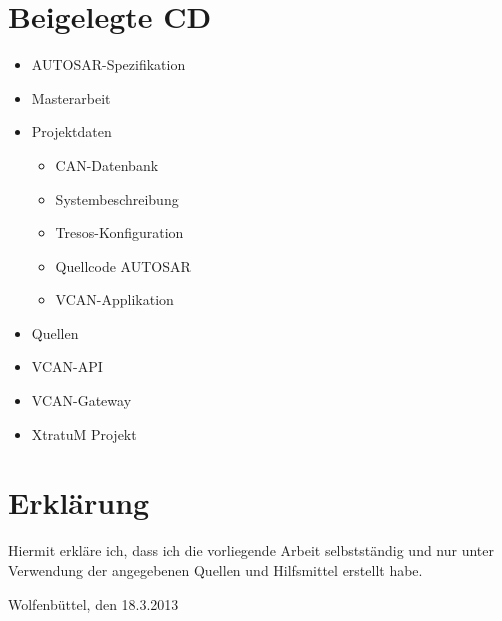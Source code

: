 \documentclass[
  a4paper,					    %
  twoside,
  DIV=calc,     				%
  bibliography=totoc,
  cleardoublepage=empty,
  ngerman,     					%
  final       					%
]{scrbook}
\begin{document}
\chapter{Beigelegte CD}
\label{sec:BeigelegteCD}
\begin{itemize}
    \item AUTOSAR-Spezifikation
    \item Masterarbeit
    \item Projektdaten
    \begin{itemize}
        \item CAN-Datenbank
        \item Systembeschreibung
        \item Tresos-Konfiguration
        \item Quellcode AUTOSAR
        \item VCAN-Applikation
    \end{itemize}
    \item Quellen
    \item VCAN-API
    \item VCAN-Gateway
    \item XtratuM Projekt
\end{itemize}


\chapter{Erklärung}
\label{sec:Erklärung}
Hiermit erkläre ich, dass ich die vorliegende Arbeit selbstständig und nur unter Verwendung der angegebenen Quellen und Hilfsmittel erstellt habe.
\vspace{2.5cm} \par
Wolfenbüttel, den 18.3.2013%


\glsaddall
\printglossaries



\nocite{*}

\begin{singlespace}

\end{singlespace}
\end{document}
